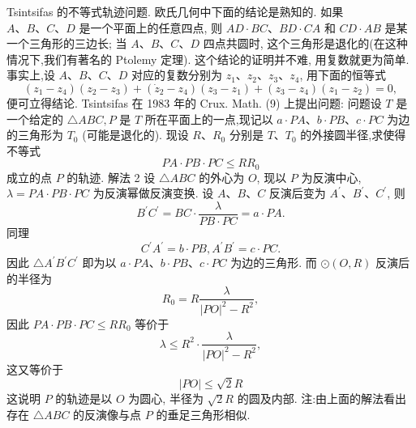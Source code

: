 Tsintsifas 的不等式轨迹问题.
欧氏几何中下面的结论是熟知的.
如果 $A 、 B 、 C 、 D$ 是一个平面上的任意四点, 则 $A D \cdot B C 、 B D \cdot C A$ 和 $C D \cdot A B$ 是某一个三角形的三边长; 当 $A 、 B 、 C 、 D$ 四点共圆时, 这个三角形是退化的(在这种情况下,我们有著名的 Ptolemy 定理).
这个结论的证明并不难, 用复数就更为简单.
事实上,设 $A 、 B 、 C 、 D$ 对应的复数分别为 $z_1 、 z_2 、 z_3 、 z_4$, 用下面的恒等式
$$
\left(z_1-z_4\right)\left(z_2-z_3\right)+\left(\dot{z}_2-z_4\right)\left(z_3-z_1\right)+\left(z_3-z_4\right)\left(z_1-z_2\right)=0,
$$
便可立得结论.
Tsintsifas 在 1983 年的 Crux. Math. (9) 上提出问题:
问题设 $T$ 是一个给定的 $\triangle A B C, P$ 是 $T$ 所在平面上的一点,现记以 $a \cdot P A 、 b \cdot P B 、 c \cdot P C$ 为边的三角形为 $T_0$ (可能是退化的). 现设 $R 、 R_0$ 分别是 $T 、 T_0$ 的外接圆半径,求使得不等式
$$
P A \cdot P B \cdot P C \leqslant R R_0
$$
成立的点 $P$ 的轨迹.
解法 2 设 $\triangle A B C$ 的外心为 $O$, 现以 $P$ 为反演中心, $\lambda=P A \cdot P B \cdot P C$ 为反演幂做反演变换.
设 $A 、 B 、 C$ 反演后变为 $A^{\prime} 、 B^{\prime} 、 C^{\prime}$, 则
$$
B^{\prime} C^{\prime}=B C \cdot \frac{\lambda}{P B \cdot P C}=a \cdot P A .
$$
同理
$$
C^{\prime} A^{\prime}=b \cdot P B, A^{\prime} B^{\prime}=c \cdot P C .
$$
因此 $\triangle A^{\prime} B^{\prime} C^{\prime}$ 即为以 $a \cdot P A 、 b \cdot P B 、 c \cdot P C$ 为边的三角形.
而 $\odot(O, R)$ 反演后的半径为
$$
R_0=R \frac{\lambda}{|P O|^2-R^2},
$$
因此 $P A \cdot P B \cdot P C \leqslant R R_0$ 等价于
$$
\lambda \leqslant R^2 \cdot \frac{\lambda}{|P O|^2-R^2},
$$
这又等价于
$$
|P O| \leqslant \sqrt{2} R
$$
这说明 $P$ 的轨迹是以 $O$ 为圆心, 半径为 $\sqrt{2} R$ 的圆及内部.
注:由上面的解法看出存在 $\triangle A B C$ 的反演像与点 $P$ 的垂足三角形相似.


